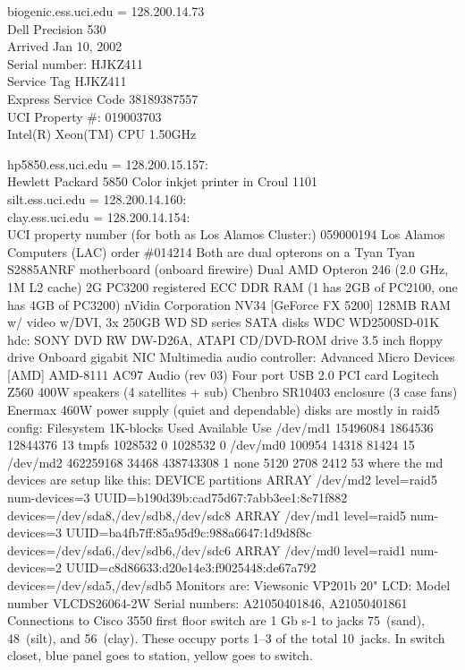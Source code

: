 \documentclass[12pt,twoside]{article}
\begin{document}
biogenic.ess.uci.edu = 128.200.14.73\\
Dell Precision 530\\
Arrived Jan 10, 2002\\
Serial number: HJKZ411\\
Service Tag HJKZ411\\
Express Service Code 38189387557\\
UCI Property \#: 019003703\\
Intel(R) Xeon(TM) CPU 1.50GHz

hp5850.ess.uci.edu = 128.200.15.157:\\
Hewlett Packard 5850 Color inkjet printer in Croul 1101\\

silt.ess.uci.edu = 128.200.14.160:\\
clay.ess.uci.edu = 128.200.14.154:\\
UCI property number (for both as Los Alamos Cluster:) 059000194
Los Alamos Computers (LAC) order \#014214
Both are dual opterons on a Tyan
Tyan S2885ANRF motherboard (onboard firewire) 
Dual AMD Opteron 246 (2.0 GHz, 1M L2 cache) 
2G PC3200 registered ECC DDR RAM (1 has 2GB of PC2100, one has 4GB of PC3200)
nVidia Corporation NV34 [GeForce FX 5200] 128MB RAM w/ video w/DVI,
3x 250GB WD SD series SATA disks WDC WD2500SD-01K
hdc: SONY DVD RW DW-D26A, ATAPI CD/DVD-ROM drive
3.5 inch floppy drive 
Onboard gigabit NIC 
Multimedia audio controller: Advanced Micro Devices [AMD] AMD-8111 AC97 Audio (rev 03)
Four port USB 2.0 PCI card 
Logitech Z560 400W speakers (4 satellites + sub) 
Chenbro SR10403 enclosure (3 case fans) 
Enermax 460W power supply (quiet and dependable) 
disks are mostly in raid5 config:
Filesystem           1K-blocks      Used Available Use%
/dev/md1              15496084   1864536  12844376  13%
tmpfs                  1028532         0   1028532   0%
/dev/md0                100954     14318     81424  15%
/dev/md2             462259168     34468 438743308   1%
none                      5120      2708      2412  53%
where the md devices are setup like this:
DEVICE partitions
ARRAY /dev/md2 level=raid5 num-devices=3 UUID=b190d39b:cad75d67:7abb3ee1:8c71f882
   devices=/dev/sda8,/dev/sdb8,/dev/sdc8
ARRAY /dev/md1 level=raid5 num-devices=3 UUID=ba4fb7ff:85a95d9c:988a6647:1d9d8f8c
   devices=/dev/sda6,/dev/sdb6,/dev/sdc6
ARRAY /dev/md0 level=raid1 num-devices=2 UUID=c8d86633:d20e14e3:f9025448:de67a792
   devices=/dev/sda5,/dev/sdb5
Monitors are: Viewsonic VP201b 20" 
LCD: Model number VLCDS26064-2W
Serial numbers: A21050401846, A21050401861
Connections to Cisco 3550 first floor switch are 1 Gb s-1 to jacks
75~(sand), 48~(silt), and 56~(clay). 
These occupy ports 1--3 of the total 10~jacks.
In switch closet, blue panel goes to station, yellow goes to switch.
\end{document}
